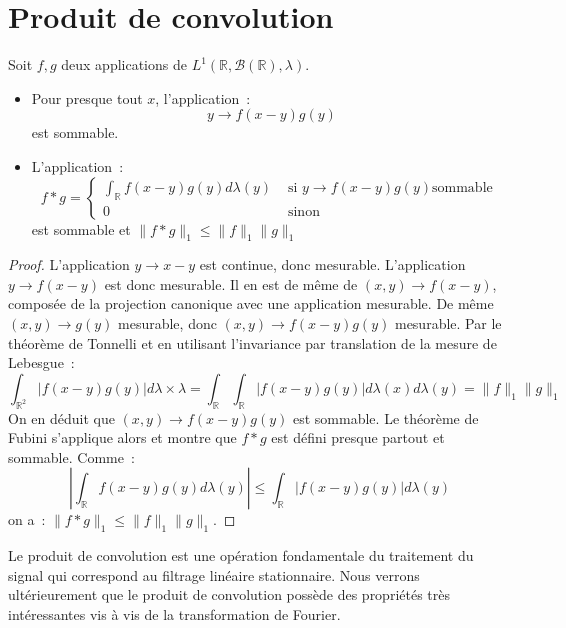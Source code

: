 \section{Produit de convolution}
\begin{mandatory}
\begin{prop}
Soit $f,g$ deux applications de $L^1(\mathbb{R},
\mathcal{B}(\mathbb{R}), \lambda)$. 
\begin{itemize}
\item Pour presque tout $x$, l'application~:
\[
y \to f(x-y)g(y)
\]
est sommable.
\item L'application~:
\[
f * g = \left \{
\begin{array}{cc}
\int_{\mathbb{R}} f(x-y) g(y) d\lambda(y) & \mbox{ si } y \to f(x-y)g(y) \mbox{
sommable } \\
0 & \mbox{ sinon }
\end{array}
\right .
\]
est sommable et $\|f*g \|_1 \leq \|f\|_1 \|g\|_1$
\end{itemize}
\end{prop}
\end{mandatory}
\begin{proof}
L'application $y  \to x-y$ est continue, donc mesurable. L'application
$y \to f(x-y)$ est donc mesurable. Il en est de même de $(x,y) \to
f(x-y)$, composée de la projection canonique avec une application
mesurable. De même $(x,y) \to g(y)$ mesurable, donc $(x,y) \to
f(x-y)g(y)$ mesurable.
Par le théorème de Tonnelli et en utilisant l'invariance par
translation de la mesure de Lebesgue~:
\[
\int_{\mathbb{R}^2} |f(x-y)g(y)| d\lambda \times \lambda =
\int_{\mathbb{R}} \int_{\mathbb{R}} |f(x-y)g(y)| d \lambda(x) d
\lambda(y) = \|f\|_1 \|g\|_1
\]
On en déduit que $(x,y)\to f(x-y)g(y)$ est sommable. Le théorème de
Fubini s'applique alors et montre que $f*g$ est défini presque partout
et sommable. Comme~:
\[
\left | \int_{\mathbb{R}} f(x-y)g(y) d \lambda(y) \right | \leq  \int_{\mathbb{R}} |f(x-y)g(y)| d \lambda(y)
\]
on a~: $\|f*g \|_1 \leq \|f\|_1 \|g\|_1$.
\end{proof}
Le produit de convolution est une opération fondamentale du traitement
du signal qui correspond au filtrage linéaire stationnaire. Nous
verrons ultérieurement que le produit de convolution possède des
propriétés très intéressantes vis à vis de la transformation de Fourier.

